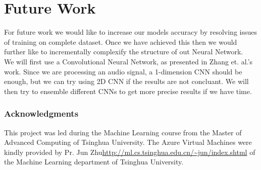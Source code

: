 \documentclass{article} %
\begin{document}

\section{Future Work}
	For future work we would like to increase our models accuracy by resolving issues of training on complete dataset. Once we have achieved this then we would further like to incrementally complexify the structure of out Neural Network.\\
	\newline
    We will first use a Convolutional Neural Network, as presented in Zhang et. al.'s work\cite{cite6}. Since we are processing an audio signal, a 1-dimension CNN should be enough, but we can try using 2D CNN if the results are not concluant. We will then try to ensemble different CNNs to get more precise results if we have time.

\subsubsection*{Acknowledgments}

	This project was led during the Machine Learning course from the Master of Advanced Computing of Tsinghua University. The Azure Virtual Machines were kindly provided by Pr. Jun Zhu\url{http://ml.cs.tsinghua.edu.cn/~jun/index.shtml} of the Machine Learning department of Tsinghua University.

\nocite{*}


\end{document}

